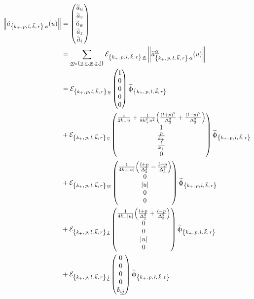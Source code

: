 \begin{equation}
  \begin{split}
    \norm{\tildea_{\kmkrgen\, \alpha}(u)}
    & =
    \mqty(%
      \tildea_u
      \\
      \tildea_v
      \\
      \tildea_w
      \\
      \tildea_z
      \\
      \tildea_i
    )
    \\
    & =
    \sum\limits_{\ualpha \in \qty{\underu, \underv, \underw, \underz, \underi}}
    \cE_{\kmkrgen\, \ualpha}\,
    \norm{\tildea^{\ualpha}_{\kmkrgen\, \alpha}(u)}
    \\
    & =
    \cE_{\kmkrgen\, \underu}\,
    \mqty( 1 \\ 0 \\ 0 \\ 0 \\ 0 )\,
    \tphi_{\kmkrgen}
    \\
    & +
    \cE_{\kmkrgen\, \underv}\,
    \mqty(%
      \frac{i}{2 k_+ u}
      +
      \frac{1}{8 k_+^2 u^2}
      \qty( \frac{(l + p)^2}{\Delta_2^2} + \frac{(l - p)^2}{\Delta_3^2} )
      \\
      1
      \\
      \frac{p}{k_+}
      \\
      \frac{l}{k_+}
      \\
      0
    )\,
    \tphi_{\kmkrgen}
    \\
    & +
    \cE_{\kmkrgen\, \underw}\,
    \mqty(
      \frac{1}{4 k_+ \abs{u}}
      \qty( \frac{l + p}{\Delta_2^2} - \frac{l - p}{\Delta_3^2} )
      \\
      0
      \\
      \abs{u}
      \\
      0
      \\
      0
    )\,
    \tphi_{\kmkrgen}
    \\
    & +
    \cE_{\kmkrgen\, \underz}\,
    \mqty(
      \frac{1}{4 k_+ \abs{u}}
      \qty( \frac{l + p}{\Delta_2^2} + \frac{l - p}{\Delta_3^2} )
      \\
      0
      \\
      0
      \\
      \abs{u}
      \\
      0
    )\,
    \tphi_{\kmkrgen}
    \\
    & +
    \cE_{\kmkrgen\, \underj}\,
    \mqty( 0 \\ 0 \\ 0 \\ 0 \\ \delta_{\underline{i j}} )\,
    \tphi_{\kmkrgen}
  \end{split}
\end{equation}
